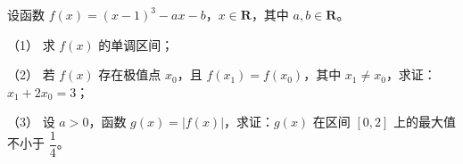 \begin{question}
设函数 \(f(x)=(x-1)^{3}-ax-b\)，\(x\in\mathbf{R}\)，其中 \(a,b\in\mathbf{R}\)。

（1） 求 \(f(x)\) 的单调区间；

（2） 若 \(f(x)\) 存在极值点 \(x_{0}\)，且 \(f(x_{1})=f(x_{0})\)，其中 \(x_{1}\neq x_{0}\)，求证：\(x_{1}+2x_{0}=3\)；

（3） 设 \(a>0\)，函数 \(g(x)=|f(x)|\)，求证：\(g(x)\) 在区间 \([0,2]\) 上的最大值不小于 \(\dfrac{1}{4}\)。

\end{question}
